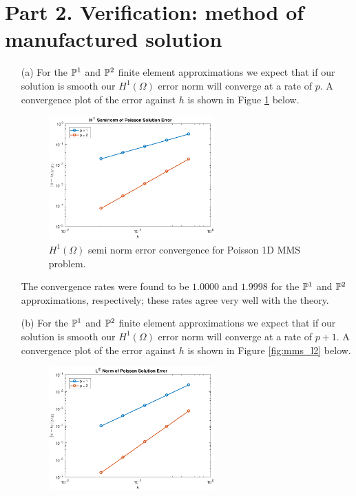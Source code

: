 \documentclass{article}
\begin{document}
\section*{Part 2. Verification: method of manufactured solution}
\begin{itemize}
	\item[(a)] For the \(\mathbb{P}^1 \) and \(\mathbb{P}^2 \) finite element approximations we expect that if our solution is smooth our \(H^1(\Omega) \) error norm will converge at a rate of \(p\). A convergence plot of the error against \(h\) is shown in Figue \ref{fig:mms_h1} below.
	\begin{figure}[H]
		\centering
		\includegraphics[width=0.6\textwidth]{MMS_H1_conv.pdf}
		\caption{\(H^1(\Omega)\) semi norm error convergence for Poisson 1D MMS problem.}
		\label{fig:mms_h1}
	\end{figure}
	The convergence rates were found to be \(1.0000\) and \(1.9998\) for the \(\mathbb{P}^1 \) and \(\mathbb{P}^2 \) approximations, respectively; these rates agree very well with the theory.
	\item[(b)] For the \(\mathbb{P}^1 \) and \(\mathbb{P}^2 \) finite element approximations we expect that if our solution is smooth our \(H^1(\Omega) \) error norm will converge at a rate of \(p+1\). A convergence plot of the error against \(h\) is shown in Figure \ref{fig:mms_l2} below.
	\begin{figure}[H]
		\centering
		\includegraphics[width=0.6\textwidth]{MMS_L2_conv.pdf}

\end{figure}
\end{itemize}
\end{document}
